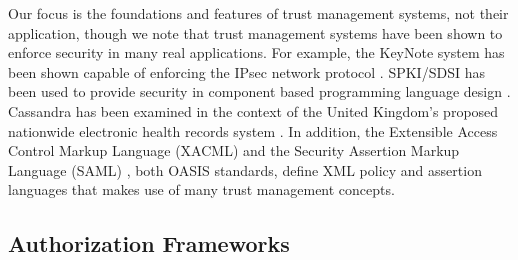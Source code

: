 Our focus is the foundations and features of trust management systems, not
their application, though we note that trust management systems have been
shown to enforce security in many real applications. For example, the
KeyNote system has been shown capable of enforcing the IPsec network
protocol \cite{Blaze:TMIPS,Blaze:EKTMS}. SPKI/SDSI has been used to provide
security in component based programming language design \cite{Liu:CSI}.
Cassandra has been examined in the context of the United Kingdom's proposed
nationwide electronic health records system \cite{Becker:CFTMAEHR}. In
addition, the Extensible Access Control Markup Language (XACML)
\cite{OASIS:XACMLTC} and the Security Assertion Markup Language (SAML)
\cite{OASIS:SSTC}, both OASIS standards, define XML policy and assertion
languages that makes use of many trust management concepts.

\subsection{Authorization Frameworks}


%
%


